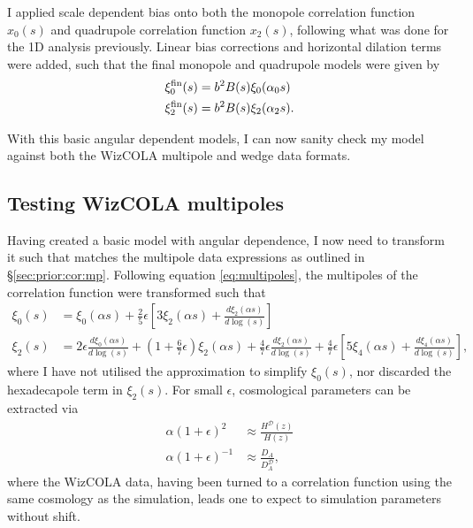 \documentclass[titlesmallcaps, examinerscopy, copyrightpage]{uqthesis}
\begin{document}
I applied scale dependent bias onto both the monopole correlation function $x_0(s)$ and quadrupole correlation function $x_2(s)$, following what was done for the 1D analysis previously. Linear bias corrections and horizontal dilation terms were added, such that the final monopole and quadrupole models were given by
\begin{align}
\xi_0^{\rm{fin}}(s) &= b^2 B(s) \xi_0(\alpha_0 s) \\
\xi_2^{\rm{fin}}(s) &= b^2 B(s) \xi_2(\alpha_2 s).
\end{align}

With this basic angular dependent models, I can now sanity check my model against both the WizCOLA multipole and wedge data formats.

\subsection{Testing WizCOLA multipoles}

Having created a basic model with angular dependence, I now need to transform it such that matches the multipole data expressions as outlined in \S\ref{sec:prior:cor:mp}. Following equation \eqref{eq:multipoles}, the multipoles of the correlation function were transformed such that
\begin{align}
\xi_0(s) &= \xi_0(\alpha s) + \frac{2}{5}\epsilon \left[ 3 \xi_2(\alpha s) + \frac{d \xi_2(\alpha s)}{d \log(s)}\right] \\
\xi_2(s) &= 2\epsilon \frac{d \xi_0(\alpha s)}{d\log(s)} + \left( 1 + \frac{6}{7}\epsilon\right) \xi_2(\alpha s) + \frac{4}{7} \epsilon \frac{d \xi_2(\alpha s)}{d \log(s)} + \frac{4}{7}\epsilon \left[ 5 \xi_4 (\alpha s) + \frac{d \xi_4(\alpha s)}{d \log(s)} \right] ,
\end{align}
where I have not utilised the approximation to simplify $\xi_0(s)$, nor discarded the hexadecapole term in $\xi_2(s)$. For small $\epsilon$, cosmological parameters can be extracted via
\begin{align}
\alpha(1 + \epsilon)^2 &\approx \frac{H^\mathcal{D}(z)}{H(z)} \\
\alpha(1 + \epsilon)^{-1} &\approx \frac{D_A}{D_A^\mathcal{D}},
\end{align}
where the WizCOLA data, having been turned to a correlation function using the same cosmology as the simulation, leads one to expect to simulation parameters without shift. 
\end{document}
